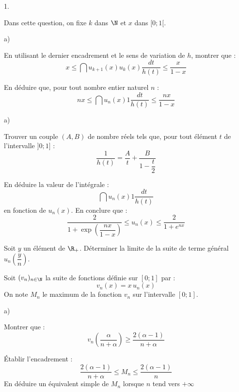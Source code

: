 \documentclass[11pt]{article}%
\begin{document}
\begin{noliste}{1.}
\item Dans cette question, on fixe $k$ dans $\N$ et $x$ dans $[0;1[$.

\begin{noliste}{a)}
 \setlength{\itemsep}{2mm}
\item En utilisant le dernier encadrement et le sens de variation de
$h$,
montrer que : 
\[
x\leq \dint{u_{k + 1}(x)}{u_{k}(x)}\dfrac{dt}{h(t)}\leq 
\dfrac{x}{1-x}
\]

\item En déduire que, pour tout nombre entier naturel $n$ : 
\[
nx\leq \dint{u_{n}(x)}{1}\dfrac{dt}{h(t)}\leq \dfrac{nx}{1-x}
\]
\end{noliste}

\item 

\begin{noliste}{a)}
 \setlength{\itemsep}{2mm}
\item Trouver un couple $(A,B)$ de nombre réels tels que, pour tout
élément $t$ de l'intervalle $]0;1]$ : 
\[
\dfrac{1}{h(t)} = \dfrac{A}{t} + \dfrac{B}{1-\dfrac{t}{2}}
\]

\item En déduire la valeur de l'intégrale : 
\[
\dint{u_{n}(x)}{1}\dfrac{dt}{h(t)}
\]
en fonction de $u_{n}(x)$. En conclure que : 
\[
\dfrac{2}{1 + \exp \left( \dfrac{nx}{1-x}\right) }\leq u_{n}(x)\leq 
\dfrac{2}{1 + e^{nx}}
\]
\end{noliste}

\item Soit $y$ un élément de $\R_{+}$. Déterminer la limite de la
suite de terme général $u_{n}\left( \dfrac{y}{n}\right) $.

\item \label{question} Soit $(v_{n})_{n\in \N}$ la suite de
fonctions définie sur $[0;1]$ par : 
\[
v_{n}(x) = x\,u_{n}(x)
\]
On note $M_{n}$ le maximum de la fonction $v_{n}$ sur l'intervalle
$[0;1]$.

\begin{noliste}{a)}
 \setlength{\itemsep}{2mm}
\item Montrer que : 
\[
v_{n}\left( \dfrac{\alpha }{n + \alpha }\right) \geq \dfrac{2(\alpha
-1)}{n + \alpha }
\]

\item Établir l'encadrement : 
\[
\dfrac{2(\alpha -1)}{n + \alpha }\leq M_{n}\leq \dfrac{2(\alpha -1)}{n}
\]
En déduire un équivalent simple de $M_{n}$ lorsque $n$ tend vers $ +
\infty $
\end{noliste}
\end{noliste}

\label{fin}
\end{document}
